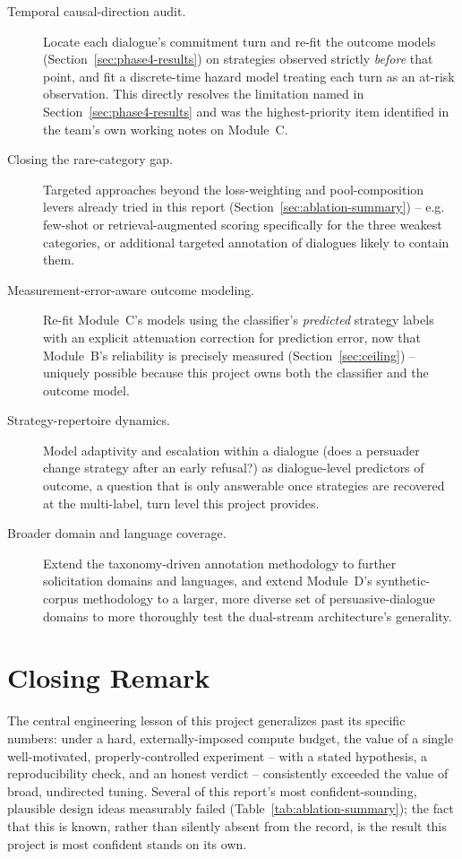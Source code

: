 \begin{description}
\item[Temporal causal-direction audit.] Locate each dialogue's commitment
  turn and re-fit the outcome models (Section~\ref{sec:phase4-results}) on
  strategies observed strictly \emph{before} that point, and fit a
  discrete-time hazard model treating each turn as an at-risk observation.
  This directly resolves the limitation named in
  Section~\ref{sec:phase4-results} and was the highest-priority item
  identified in the team's own working notes on Module~C.
\item[Closing the rare-category gap.] Targeted approaches beyond the
  loss-weighting and pool-composition levers already tried in this report
  (Section~\ref{sec:ablation-summary}) -- e.g. few-shot or retrieval-augmented
  scoring specifically for the three weakest categories, or additional
  targeted annotation of dialogues likely to contain them.
\item[Measurement-error-aware outcome modeling.] Re-fit Module~C's models
  using the classifier's \emph{predicted} strategy labels with an explicit
  attenuation correction for prediction error, now that Module~B's
  reliability is precisely measured (Section~\ref{sec:ceiling}) -- uniquely
  possible because this project owns both the classifier and the outcome
  model.
\item[Strategy-repertoire dynamics.] Model adaptivity and escalation within
  a dialogue (does a persuader change strategy after an early refusal?) as
  dialogue-level predictors of outcome, a question that is only answerable
  once strategies are recovered at the multi-label, turn level this project
  provides.
\item[Broader domain and language coverage.] Extend the taxonomy-driven
  annotation methodology to further solicitation domains and languages, and
  extend Module~D's synthetic-corpus methodology to a larger, more diverse
  set of persuasive-dialogue domains to more thoroughly test the dual-stream
  architecture's generality.
\end{description}

\section{Closing Remark}

The central engineering lesson of this project generalizes past its specific
numbers: under a hard, externally-imposed compute budget, the value of a
single well-motivated, properly-controlled experiment -- with a stated
hypothesis, a reproducibility check, and an honest verdict -- consistently
exceeded the value of broad, undirected tuning. Several of this report's
most confident-sounding, plausible design ideas measurably failed
(Table~\ref{tab:ablation-summary}); the fact that this is known, rather than
silently absent from the record, is the result this project is most
confident stands on its own.
